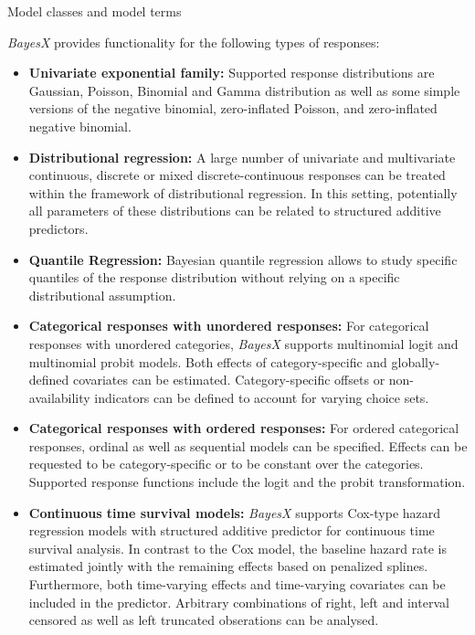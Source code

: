\begin{stanza}{Model classes and model terms}

{\em BayesX} provides functionality for the following types of
responses:

\begin{itemize}
\item{\bf\sffamily Univariate exponential family:} Supported response distributions are Gaussian, Poisson, Binomial and Gamma distribution as well as some simple versions of the
    negative binomial, zero-inflated Poisson, and zero-inflated negative binomial.

\item {\bf\sffamily Distributional regression:} A large number of univariate and multivariate continuous, discrete or mixed discrete-continuous responses can be treated within the framework of distributional regression. In this setting, potentially all parameters of these distributions can be related to structured additive predictors.

\item {\bf\sffamily Quantile Regression:} Bayesian quantile regression allows to study specific quantiles of the response distribution without relying on a specific distributional assumption.

\item{\bf\sffamily Categorical responses with unordered responses:} For categorical responses with unordered categories,
    {\em BayesX} supports multinomial logit and multinomial probit models. Both effects of category-specific and
    globally-defined covariates can be estimated. Category-specific offsets or non-availability indicators can be defined
    to account for varying choice sets.

\item{\bf\sffamily Categorical responses with ordered responses:} For ordered categorical responses, ordinal as well as
    sequential models can be specified. Effects can be requested to be category-specific or to be constant over the
    categories. Supported response functions include the logit and the probit transformation.

\item{\bf\sffamily Continuous time survival models:} {\em BayesX} supports Cox-type hazard regression models with
    structured additive predictor for continuous time survival analysis. In contrast to the Cox model, the baseline hazard
    rate is estimated jointly with the remaining effects based on penalized splines. Furthermore, both time-varying effects
    and time-varying covariates can be included in the predictor. Arbitrary combinations of right, left and interval
    censored as well as left truncated obserations can be analysed.


\end{itemize}
\end{stanza}

